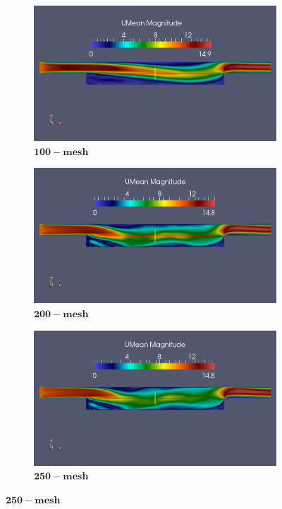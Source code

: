 \documentclass[a4paper,english,11pt,twoside]{article}
\begin{document}
\begin{figure}[h!]
	\begin{subfigure}{0.3\textwidth}
		\includegraphics[width=0.95\linewidth]{piso_10_filteredLinear_mean_u.png}
		\caption{$\mathbf{100-mesh}$}
	\end{subfigure}
	\begin{subfigure}{0.3\textwidth}
		\includegraphics[width=0.95\linewidth]{piso_20_filteredLinear_mean_u.png}
		\caption{$\mathbf{200-mesh}$}
	\end{subfigure}
	\begin{subfigure}{0.3\textwidth}
		\includegraphics[width=0.95\linewidth]{piso_25_filteredLinear_mean_u.png}
		\caption{$\mathbf{250-mesh}$}
	\end{subfigure}
\end{figure}\\
\end{document}
